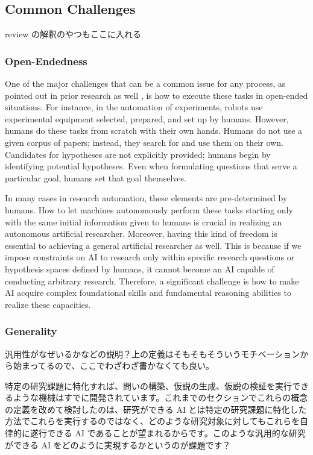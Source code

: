 \subsection{Common Challenges}
review の解釈のやつもここに入れる

\subsubsection{Open-Endedness}
One of the major challenges that can be a common issue for any process, as pointed out in prior research as well  \cite{coley2020autonomousII}, is how to execute these tasks in open-ended situations. For instance, in the automation of experiments, robots use experimental equipment selected, prepared, and set up by humans. However, humans do these tasks from scratch with their own hands. Humans do not use a given corpus of papers; instead, they search for and use them on their own. Candidates for hypotheses are not explicitly provided; humans begin by identifying potential hypotheses. Even when formulating questions that serve a particular goal, humans set that goal themselves. 

In many cases in research automation, these elements are pre-determined by humans. How to let machines autonomously perform these tasks starting only with the same initial information given to humans is crucial in realizing an autonomous artificial researcher. Moreover, having this kind of freedom is essential to achieving a general artificial researcher as well. This is because if we impose constraints on AI to research only within specific research questions or hypothesis spaces defined by humans, it cannot become an AI capable of conducting arbitrary research. Therefore, a significant challenge is how to make AI acquire complex foundational skills and fundamental reasoning abilities to realize these capacities.

\subsubsection{Generality}
汎用性がなぜいるかなどの説明？上の定義はそもそもそういうモチベーションから始まってるので、ここでわざわざ書かなくても良い。

特定の研究課題に特化すれば、問いの構築、仮説の生成、仮説の検証を実行できるような機械はすでに開発されています。これまでのセクションでこれらの概念の定義を改めて検討したのは、研究ができる AI とは特定の研究課題に特化した方法でこれらを実行するのではなく、どのような研究対象に対してもこれらを自律的に遂行できる AI であることが望まれるからです。このような汎用的な研究ができる AI をどのように実現するかというのが課題です？

